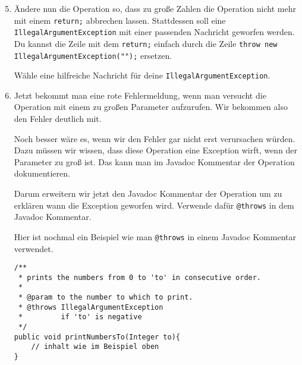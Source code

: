 \begin{enumerate}\setcounter{enumi}{4}
	\item
		Ändere nun die Operation so, dass zu große Zahlen die Operation nicht mehr mit einem \lstinline{return;} abbrechen lassen.
		Stattdessen soll eine \lstinline{IllegalArgumentException} mit einer passenden Nachricht geworfen werden.
		Du kannst die Zeile mit dem \lstinline{return;} einfach durch die Zeile \lstinline{throw new IllegalArgumentException("");} ersetzen.

		Wähle eine hilfreiche Nachricht für deine \lstinline{IllegalArgumentException}.

	\item
		Jetzt bekommt man eine rote Fehlermeldung, wenn man versucht die Operation mit einem zu großen Parameter aufzurufen.
		Wir bekommen also den Fehler deutlich mit.

		Noch besser wäre es, wenn wir den Fehler gar nicht erst verursachen würden.
		Dazu müssen wir wissen, dass diese Operation eine Exception wirft, wenn der Parameter zu groß ist.
		Das kann man im Javadoc Kommentar der Operation dokumentieren.
		
		Darum erweitern wir jetzt den Javadoc Kommentar der Operation um zu erklären wann die Exception geworfen wird. 
		Verwende dafür \lstinline{@throws} in dem Javadoc Kommentar.

		Hier ist nochmal ein Beispiel wie man \lstinline{@throws} in einem Javadoc Kommentar verwendet.

		\begin{lstlisting}
/**
 * prints the numbers from 0 to 'to' in consecutive order.
 * 
 * @param to the number to which to print.
 * @throws IllegalArgumentException
 *         if 'to' is negative
 */
public void printNumbersTo(Integer to){
    // inhalt wie im Beispiel oben
}
		\end{lstlisting}
\end{enumerate}
\newpage
